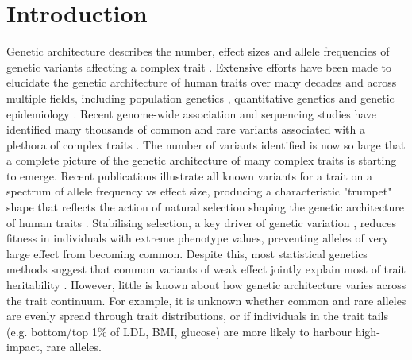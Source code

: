 \documentclass[12pt]{zHenriquesLab-StyleBioRxiv}
\begin{document}
\section*{Introduction}  \label{sec:intro}  
Genetic architecture describes the number, effect sizes and allele frequencies of genetic 
variants affecting a complex trait \cite{Timpson2018}. Extensive efforts have been made 
to elucidate the genetic architecture of human traits over many decades and across multiple fields, 
including population genetics \cite{Oconnor2019}, quantitative genetics \cite{Polderman2015} 
and genetic epidemiology \cite{Abdellaoui2023}. Recent genome-wide association and sequencing 
studies have identified many thousands of common and rare variants associated with a 
plethora of complex traits \cite{Flannick2019, Singh2022}. The number of variants 
identified is now so large that a complete picture of the genetic architecture of 
many complex traits is starting to emerge. Recent publications illustrate all known 
variants for a trait on a spectrum of allele frequency vs effect size, producing a 
characteristic "trumpet" shape \cite{Yengo2022, Corte2023} that reflects the action of natural selection
shaping the genetic architecture of human traits \cite{Ori2024, Koch2024}. 
Stabilising selection, a key driver of genetic variation \cite{Oconnor2019, Ori2024}, 
reduces fitness in individuals with extreme phenotype values, preventing alleles of 
very large effect from becoming common. Despite this, most statistical genetics methods 
suggest that common variants of weak effect jointly explain most of 
trait heritability \cite{Golan2014, Wainschtein2022,Pathan2024}. However, little is 
known about how genetic architecture varies across the trait continuum. 
For example, it is unknown whether common and rare alleles are evenly spread through 
trait distributions, or if individuals in the trait 
tails (e.g. bottom/top 1\% of LDL, BMI, glucose) are more likely to harbour high-impact, rare alleles.
\end{document}
